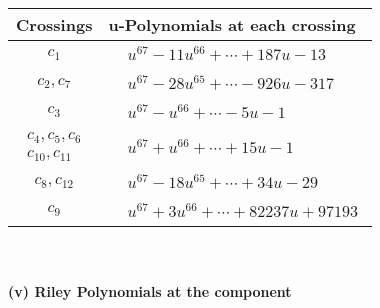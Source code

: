 \documentclass[1p]{elsarticle_modified}
\theoremstyle{definition}
\begin{document}
\begin{tabular}{m{50pt}|m{274pt}}
Crossings & \hspace{64pt}u-Polynomials at each crossing \\
\hline $$\begin{aligned}c_{1}\end{aligned}$$&$\begin{aligned}
&u^{67}-11 u^{66}+\cdots+187 u-13
\end{aligned}$\\
\hline $$\begin{aligned}c_{2},c_{7}\end{aligned}$$&$\begin{aligned}
&u^{67}-28 u^{65}+\cdots-926 u-317
\end{aligned}$\\
\hline $$\begin{aligned}c_{3}\end{aligned}$$&$\begin{aligned}
&u^{67}- u^{66}+\cdots-5 u-1
\end{aligned}$\\
\hline $$\begin{aligned}c_{4},c_{5},c_{6}\\c_{10},c_{11}\end{aligned}$$&$\begin{aligned}
&u^{67}+u^{66}+\cdots+15 u-1
\end{aligned}$\\
\hline $$\begin{aligned}c_{8},c_{12}\end{aligned}$$&$\begin{aligned}
&u^{67}-18 u^{65}+\cdots+34 u-29
\end{aligned}$\\
\hline $$\begin{aligned}c_{9}\end{aligned}$$&$\begin{aligned}
&u^{67}+3 u^{66}+\cdots+82237 u+97193
\end{aligned}$\\
\hline
\end{tabular}\\~\\
\newpage\renewcommand{\arraystretch}{1}
\flushleft \textbf{(v) Riley Polynomials at the component}\newline \\
\end{document}
